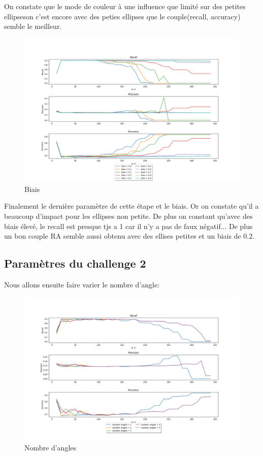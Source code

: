 \documentclass[a4paper,12pt, openany]{book}
\theoremstyle{break}
\begin{document}
On constate que le mode de couleur à une influence que limité sur des petites ellipseson c'est encore avec des peties ellipses que le couple(recall, accuracy) semble le meilleur.

\begin{figure}[H]
  \includegraphics[width=\textwidth]{images/compare_bias}
  \caption{Biais}
  \label{fig:biais}
\end{figure}

Finalement le dernière paramètre de cette étape et le biais. Or on constate qu'il a beaucoup d'impact pour les ellipses non petite. De plus on constant qu'avec des biais élevé, le recall est presque tjs a 1 car il n'y a pas de faux négatif... De plus un bon couple RA semble aussi obtenu avec des ellises petites et un biais de $0.2$.

\subsection{Paramètres du challenge 2}
Nous allons ensuite faire varier le nombre d'angle:

\begin{figure}[H]
  \includegraphics[width=\textwidth]{images/compare_angle}
  \caption{Nombre d'angles}
  \label{fig:angles}
\end{figure}
\end{document}
